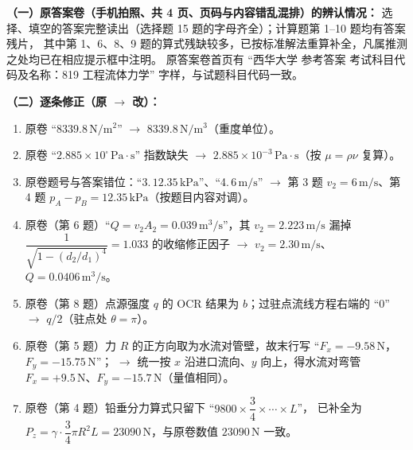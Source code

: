 \begin{tishi}
\textbf{（一）原答案卷（手机拍照、共 4 页、页码与内容错乱混排）的辨认情况：}
选择、填空的答案完整读出（选择题 15 题的字母齐全）；计算题第 1--10 题均有答案残片，
其中第 1、6、8、9 题的算式残缺较多，已按标准解法重算补全，凡属推测之处均已在相应提示框中注明。
原答案卷首页有 ``西华大学 参考答案 考试科目代码及名称：819 工程流体力学'' 字样，与试题科目代码一致。

\textbf{（二）逐条修正（原 $\to$ 改）：}
\begin{enumerate}
  \item 原卷 ``$8339.8\,\mathrm{N/m^{2}}$'' $\to$ $8339.8\,\mathrm{N/m^{3}}$（重度单位）。
  \item 原卷 ``$2.885\times10^{\square}\,\mathrm{Pa\cdot s}$'' 指数缺失 $\to$ $2.885\times10^{-3}\,\mathrm{Pa\cdot s}$（按 $\mu=\rho\nu$ 复算）。
  \item 原卷题号与答案错位：``3.\,$12.35\,\mathrm{kPa}$''、``4.\,$6\,\mathrm{m/s}$'' $\to$
    第 3 题 $v_2=6\,\mathrm{m/s}$、第 4 题 $p_A-p_B=12.35\,\mathrm{kPa}$（按题目内容对调）。
  \item 原卷（第 6 题）``$Q=v_2A_2=0.039\,\mathrm{m^{3}/s}$''，其 $v_2=2.223\,\mathrm{m/s}$ 漏掉
    $\dfrac{1}{\sqrt{1-(d_2/d_1)^{4}}}=1.033$ 的收缩修正因子 $\to$ $v_2=2.30\,\mathrm{m/s}$、$Q=0.0406\,\mathrm{m^{3}/s}$。
  \item 原卷（第 8 题）点源强度 $q$ 的 OCR 结果为 $b$；过驻点流线方程右端的 ``$0$'' $\to$ $q/2$（驻点处 $\theta=\pi$）。
  \item 原卷（第 5 题）力 $R$ 的正方向取为水流对管壁，故末行写 ``$F_x=-9.58\,\mathrm{N}$，$F_y=-15.75\,\mathrm{N}$''；
    $\to$ 统一按 $x$ 沿进口流向、$y$ 向上，得水流对弯管 $F_x=+9.5\,\mathrm{N}$、$F_y=-15.7\,\mathrm{N}$（量值相同）。
  \item 原卷（第 4 题）铅垂分力算式只留下 ``$9800\times\dfrac{3}{4}\times\cdots\times L$''，
    已补全为 $P_z=\gamma\cdot\dfrac{3}{4}\pi R^{2}L=23090\,\mathrm{N}$，与原卷数值 $23090\,\mathrm{N}$ 一致。
\end{enumerate}


\end{tishi}
